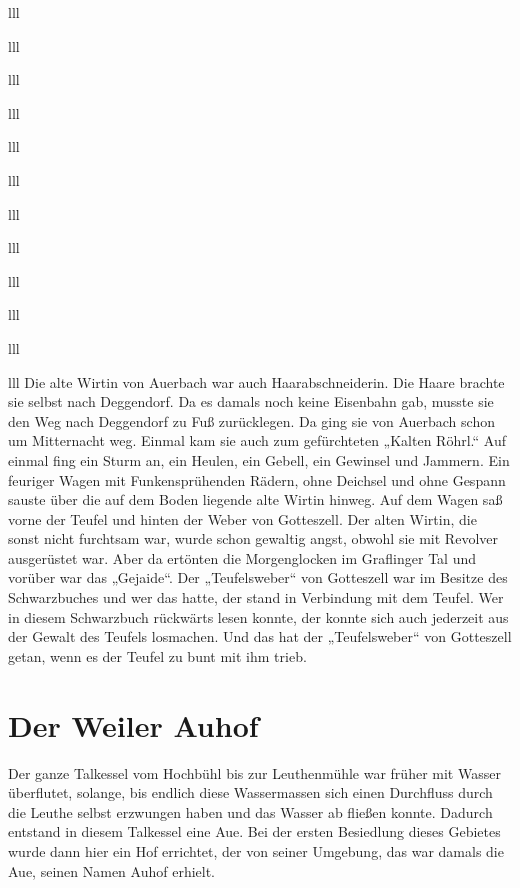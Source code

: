 \documentclass[12pt,a4pager]{book}
\begin{document}
\begin{tabuluar}{lll}
\begin{tabuluar}{lll}
\begin{tabuluar}{lll}
\begin{tabuluar}{lll}
\begin{tabuluar}{lll}
\begin{tabuluar}{lll}
\begin{tabuluar}{lll}
\begin{tabuluar}{lll}
\begin{tabuluar}{lll}
\begin{tabuluar}{lll}
\begin{tabuluar}{lll}
\begin{tabuluar}{lll}
 Die alte Wirtin von Auerbach war auch Haarabschneiderin. Die Haare brachte sie
 selbst nach Deggendorf. Da es damals noch keine Eisenbahn gab, musste sie den
 Weg nach Deggendorf zu Fuß zurücklegen. Da ging sie von Auerbach schon um
 Mitternacht weg. Einmal kam sie auch zum gefürchteten „Kalten Röhrl.“ Auf
 einmal fing ein Sturm an, ein Heulen, ein Gebell, ein Gewinsel und Jammern. Ein
 feuriger Wagen mit Funkensprühenden Rädern, ohne Deichsel und ohne Gespann
 sauste über die auf dem Boden liegende alte Wirtin hinweg. Auf dem Wagen saß
 vorne der Teufel und hinten der Weber von Gotteszell. Der alten Wirtin, die
 sonst nicht furchtsam war, wurde schon gewaltig angst, obwohl sie mit Revolver
 ausgerüstet war. Aber da ertönten die Morgenglocken im Graflinger Tal und
 vorüber war das „Gejaide“. Der „Teufelsweber“ von Gotteszell war im Besitze des
 Schwarzbuches und wer das hatte, der stand in Verbindung mit dem Teufel. Wer in
 diesem Schwarzbuch rückwärts lesen konnte, der konnte sich auch jederzeit aus
 der Gewalt des Teufels losmachen. Und das hat der „Teufelsweber“ von Gotteszell
 getan, wenn es der Teufel zu bunt mit ihm trieb.

\section{Der Weiler Auhof}

Der ganze Talkessel vom Hochbühl bis zur Leuthenmühle war früher mit Wasser
überflutet, solange, bis endlich diese Wassermassen sich einen Durchfluss durch
die Leuthe selbst erzwungen haben und das Wasser ab fließen konnte. Dadurch
entstand in diesem Talkessel eine Aue. Bei der ersten Besiedlung dieses Gebietes
wurde dann hier ein Hof errichtet, der von seiner Umgebung, das war damals die
Aue, seinen Namen Auhof erhielt.


\end{tabuluar}
\end{tabuluar}
\end{tabuluar}
\end{tabuluar}
\end{tabuluar}
\end{tabuluar}
\end{tabuluar}
\end{tabuluar}
\end{tabuluar}
\end{tabuluar}
\end{tabuluar}
\end{tabuluar}
\end{document}
